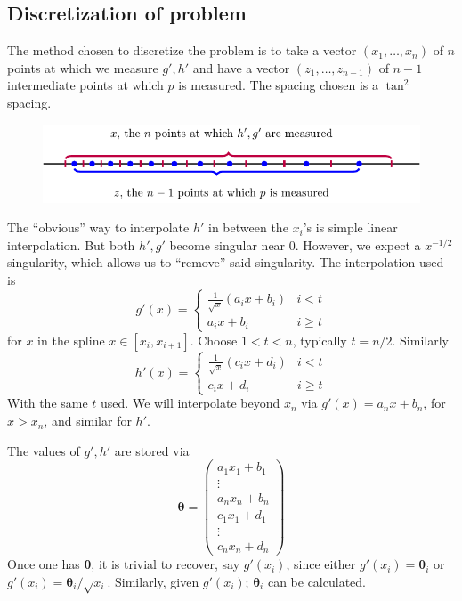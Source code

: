 \documentclass{article}
\newcommand{\bs}{\boldsymbol}                               %
\begin{document}
\subsection*{Discretization of problem}
The method chosen to discretize the problem is to take a vector 
$(x_1, \dots , x_n)$ of $n$ points at which we measure $g', h'$ and have a 
vector $(z_1, \dots ,z_{n-1})$ of $n-1$ intermediate 
points at which $p$ is measured. The spacing chosen is a $\tan^2$ spacing.
\begin{figure}[!ht]\centering
\includegraphics{NumFig2.pdf}
\end{figure}

The ``obvious'' way to interpolate $h'$ in between the $x_i$'s is 
simple linear interpolation. But both $h',g'$ become singular near 0.
However, we expect a $x^{-1/2}$ singularity, which allows us to ``remove''
said singularity. 
The interpolation used is
\[ g'(x) = \left\{ \begin{array}{cc} \frac{1}{\sqrt{x}}(a_ix+b_i) &
i <t \\ a_ix+b_i & i \geq t \end{array} \right. \]
for $x$ in the spline $x \in [x_i,x_{i+1}]$. Choose $1 < t < n$, typically
$t=n/2$. Similarly
\[ h'(x) = \left\{ \begin{array}{cc} \frac{1}{\sqrt{x}}(c_ix+d_i) &
i <t \\ c_ix+d_i & i \geq t \end{array} \right. \]
With the same $t$ used. We will interpolate beyond $x_n$ via 
$g'(x) = a_n x + b_n$, for $x>x_n$, and similar for $h'$.

The values of $g',h'$ are stored via 
\[ \bs{\theta} = \left( \begin{array}{c} a_1x_1+b_1 \\ \vdots 
\\ a_n x_n+b_n \\[4pt] c_1x_1+d_1 \\ \vdots \\ c_n x_n + d_n \end{array} 
\right) \]
Once one has $\bs{\theta}$, it is trivial to recover, say $g'(x_i)$, since
either $g'(x_i) = \bs{\theta}_i$ or $g'(x_i) = \bs{\theta}_i/\sqrt{x_i}$.
Similarly, given $g'(x_i)$; $\bs{\theta}_i$ can be calculated.
\end{document}
